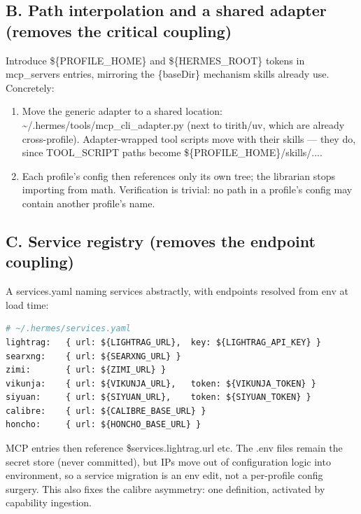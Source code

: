 \documentclass[10pt]{article}
\newcommand{\mono}[1]{{\ttfamily\small #1}}
\begin{document}
\subsection*{B. Path interpolation and a shared adapter (removes the critical coupling)}

Introduce \mono{\$\{PROFILE\_HOME\}} and \mono{\$\{HERMES\_ROOT\}} tokens in \mono{mcp\_servers}
entries, mirroring the \mono{\{baseDir\}} mechanism skills already use. Concretely:

\begin{enumerate}
    \item Move the generic adapter to a shared location:
    \mono{\textasciitilde/.hermes/tools/mcp\_cli\_adapter.py} (next to \mono{tirith}/\mono{uv},
    which are already cross-profile). Adapter-wrapped tool scripts move with their skills --- they
    do, since \mono{TOOL\_SCRIPT} paths become \mono{\$\{PROFILE\_HOME\}/skills/...}.
    \item Each profile's config then references only its own tree; the librarian stops importing from
    math. Verification is trivial: no path in a profile's config may contain another profile's name.
\end{enumerate}

\subsection*{C. Service registry (removes the endpoint coupling)}

A \mono{services.yaml} naming services abstractly, with endpoints resolved from env at load time:

\begin{lstlisting}[language=Python]
# ~/.hermes/services.yaml
lightrag:   { url: ${LIGHTRAG_URL},  key: ${LIGHTRAG_API_KEY} }
searxng:    { url: ${SEARXNG_URL} }
zimi:       { url: ${ZIMI_URL} }
vikunja:    { url: ${VIKUNJA_URL},   token: ${VIKUNJA_TOKEN} }
siyuan:     { url: ${SIYUAN_URL},    token: ${SIYUAN_TOKEN} }
calibre:    { url: ${CALIBRE_BASE_URL} }
honcho:     { url: ${HONCHO_BASE_URL} }
\end{lstlisting}

MCP entries then reference \mono{\$services.lightrag.url} etc. The .env files remain the secret
store (never committed), but IPs move out of configuration logic into environment, so a service
migration is an env edit, not a per-profile config surgery. This also fixes the calibre asymmetry:
one definition, activated by capability \mono{ingestion}.
\end{document}

